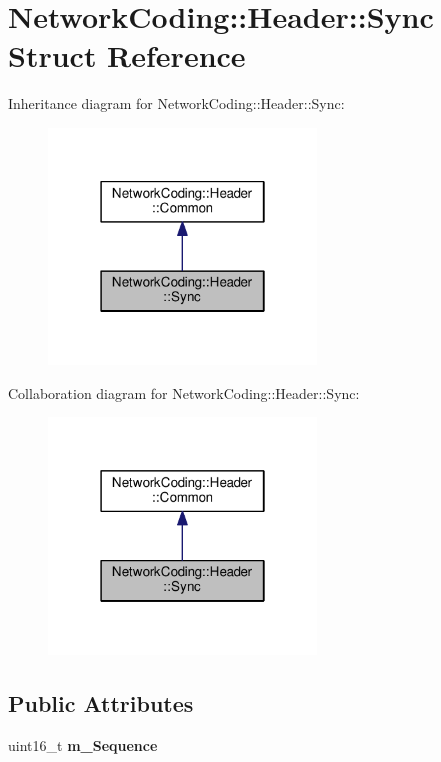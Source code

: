 \hypertarget{struct_network_coding_1_1_header_1_1_sync}{}\section{Network\+Coding\+:\+:Header\+:\+:Sync Struct Reference}
\label{struct_network_coding_1_1_header_1_1_sync}


Inheritance diagram for Network\+Coding\+:\+:Header\+:\+:Sync\+:\nopagebreak
\begin{figure}[H]
\begin{center}
\leavevmode
\includegraphics[width=202pt]{struct_network_coding_1_1_header_1_1_sync__inherit__graph}
\end{center}
\end{figure}


Collaboration diagram for Network\+Coding\+:\+:Header\+:\+:Sync\+:\nopagebreak
\begin{figure}[H]
\begin{center}
\leavevmode
\includegraphics[width=202pt]{struct_network_coding_1_1_header_1_1_sync__coll__graph}
\end{center}
\end{figure}
\subsection*{Public Attributes}
\begin{DoxyCompactItemize}
\item 
uint16\+\_\+t {\bfseries m\+\_\+\+Sequence}\hypertarget{struct_network_coding_1_1_header_1_1_sync_a3e371d3de31efd6d519e10aa7175f6ac}{}\label{struct_network_coding_1_1_header_1_1_sync_a3e371d3de31efd6d519e10aa7175f6ac}

\end{DoxyCompactItemize}
